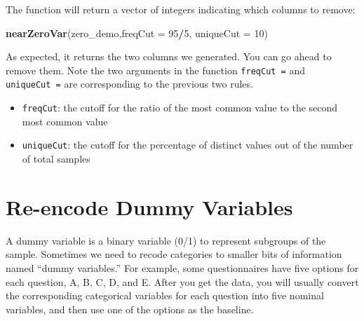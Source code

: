 \documentclass[12pt,]{krantz}
\newenvironment{Shaded}{\begin{snugshade}}{\end{snugshade}}
\newcommand{\KeywordTok}[1]{\textcolor[rgb]{0.13,0.29,0.53}{\textbf{#1}}}
\newcommand{\DataTypeTok}[1]{\textcolor[rgb]{0.13,0.29,0.53}{#1}}
\newcommand{\DecValTok}[1]{\textcolor[rgb]{0.00,0.00,0.81}{#1}}
\newcommand{\CommentTok}[1]{\textcolor[rgb]{0.56,0.35,0.01}{\textit{#1}}}
\newcommand{\OperatorTok}[1]{\textcolor[rgb]{0.81,0.36,0.00}{\textbf{#1}}}
\newcommand{\NormalTok}[1]{#1}
\providecommand{\tightlist}{%
  \setlength{\itemsep}{0pt}\setlength{\parskip}{0pt}}
\theoremstyle{definition}
\theoremstyle{definition}
\theoremstyle{definition}
\theoremstyle{remark}
\begin{document}
\begin{Shaded}
\end{Shaded}

The function will return a vector of integers indicating which columns
to remove:

\begin{Shaded}
\begin{Highlighting}[]
\KeywordTok{nearZeroVar}\NormalTok{(zero_demo,}\DataTypeTok{freqCut =} \DecValTok{95}\OperatorTok{/}\DecValTok{5}\NormalTok{, }\DataTypeTok{uniqueCut =} \DecValTok{10}\NormalTok{)}
\end{Highlighting}
\end{Shaded}

As expected, it returns the two columns we generated. You can go ahead
to remove them. Note the two arguments in the function
\texttt{freqCut\ =} and \texttt{uniqueCut\ =} are corresponding to the
previous two rules.

\begin{itemize}
\tightlist
\item
  \texttt{freqCut}: the cutoff for the ratio of the most common value to
  the second most common value
\item
  \texttt{uniqueCut}: the cutoff for the percentage of distinct values
  out of the number of total samples
\end{itemize}

\section{Re-encode Dummy Variables}\label{re-encode-dummy-variables}

A dummy variable is a binary variable (0/1) to represent subgroups of
the sample. Sometimes we need to recode categories to smaller bits of
information named ``dummy variables.'' For example, some questionnaires
have five options for each question, A, B, C, D, and E. After you get
the data, you will usually convert the corresponding categorical
variables for each question into five nominal variables, and then use
one of the options as the baseline.
\end{document}
